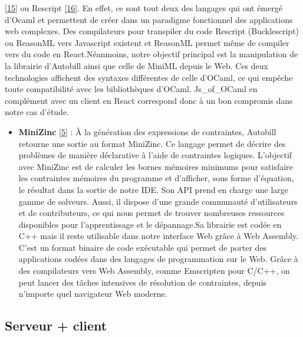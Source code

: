 \documentclass[12pt]{article}
\begin{document}
\begin{itemize}
        \protect\hyperlink{ref-reasonml}{{[}15{]}} ou Rescript
        \protect\hyperlink{ref-rescript}{{[}16{]}}. En effet, ce sont tout
        deux des langages qui ont émergé d'Ocaml et permettent de créer dans
        un paradigme fonctionnel des applications web complexes. Des
        compilateurs pour transpiler du code Rescript (Bucklescript) ou
        ReasonML vers Javascript existent et ReasonML permet même de compiler
        vers du code en React.\newline  Néanmoins, notre objectif principal
        est la manipulation de la librairie d'Autobill ainsi que celle de
        MiniML depuis le Web. Ces deux technologies affichent des syntaxes
        différentes de celle d'OCaml, ce qui empêche toute compatibilité avec
        les bibliothèques d'OCaml. Js\_of\_OCaml en complément avec un client
        en React correspond donc à un bon compromis dans notre cas d'étude.
\end{itemize}
\begin{itemize}
  \item
        \textbf{MiniZinc} \protect\hyperlink{ref-minizinc}{{[}5{]}} : À la
        génération des expressions de contraintes, Autobill retourne une
        sortie au format MiniZinc. Ce langage permet de décrire des problèmes
        de manière déclarative à l'aide de contraintes logiques. L'objectif
        avec MiniZinc est de calculer les bornes mémoires minimums pour
        satisfaire les contraintes mémoires du programme et d'afficher, sous
        forme d'équation, le résultat dans la sortie de notre IDE. Son API
        prend en charge une large gamme de solveurs. Aussi, il dispose d'une
        grande communauté d'utilisateurs et de contributeurs, ce qui nous
        permet de trouver nombreuses ressources disponibles pour
        l'apprentissage et le dépannage.\newline  Sa librairie est codée en
        C++ mais il reste utilisable dans notre interface Web grâce à Web
        Assembly. C'est un format binaire de code exécutable qui permet de
        porter des applications codées dans des langages de programmation sur
        le Web. Grâce à des compilateurs vers Web Assembly, comme Emscripten
        pour C/C++, on peut lancer des tâches intensives de résolution de
        contraintes, depuis n'importe quel navigateur Web moderne.
\end{itemize}
\fi 

\hypertarget{serveur-client}{%
  \subsection{Serveur + client}\label{serveur-client}}
\end{document}
